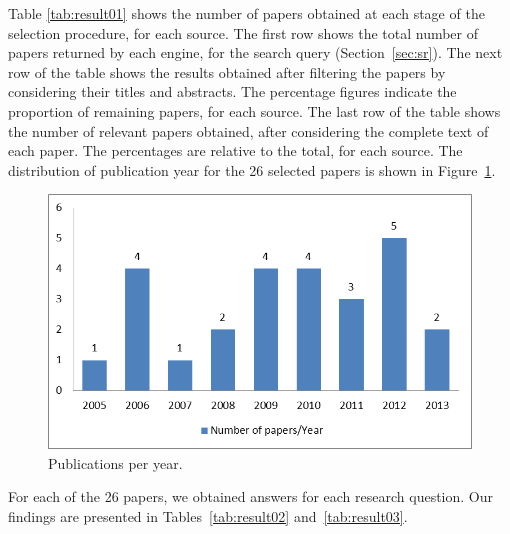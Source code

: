 \documentclass[english,12pt]{article}
\begin{document}
Table \ref{tab:result01} shows the number of papers obtained at each stage
of the selection procedure, for each source. 
The first row shows the total number of papers returned by each engine, for the search query (Section~\ref{sec:sr}).
The next row of the table shows the results obtained after filtering the papers by considering their titles and abstracts.
The percentage figures indicate the proportion of remaining papers, for each source.
The last row of the table shows the number of relevant papers obtained, after considering the complete text of each paper.
The percentages are relative to the total, for each source.
The distribution of publication year for the 26 selected papers is shown in Figure~\ref{fig:statistics}.


\begin{figure} 
\centering
\includegraphics[width=.79\textwidth]{figs/NumberPapersYear.png}
\caption{Publications per year.}
\label{fig:statistics}
\end{figure}

For each of the 26 papers, we obtained answers for each research question.
Our findings are presented in Tables~\ref{tab:result02} and~\ref{tab:result03}.
\end{document}
